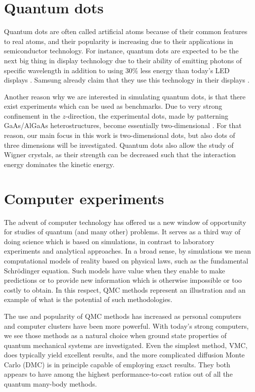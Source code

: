\section{Quantum dots}
Quantum dots are often called artificial atoms because of their common features to real atoms, and their popularity is increasing due to their applications in semiconductor technology. For instance, quantum dots are expected to be the next big thing in display technology due to their ability of emitting photons of specific wavelength in addition to using 30\% less energy than today's LED displays \cite{manders_8.3:_2015}. Samsung already claim that they use this technology in their displays \cite{noauthor_2019_nodate}.

Another reason why we are interested in simulating quantum dots, is that there exist experiments which can be used as benchmarks. Due to very strong confinement in the $z$-direction, the experimental dots, made by patterning GaAs/AlGaAs heterostructures, become essentially two-dimensional \cite{marzin_photoluminescence_1994,brunner_sharp-line_1994}. For that reason, our main focus in this work is two-dimensional dots, but also dots of three dimensions will be investigated. Quantum dots also allow the study of Wigner crystals, as their strength can be decreased such that the interaction energy dominates the kinetic energy. 

\section{Computer experiments}
The advent of computer technology has offered us a new window of opportunity for studies of quantum (and many other) problems. It serves as a third way of doing science which is based on simulations, in contrast to laboratory experiments and analytical approaches. In a broad sense, by simulations we mean computational models of reality based on physical laws, such as the fundamental Schrödinger equation. Such models have value when they enable to make predictions or to provide new information which is otherwise impossible or too costly to obtain. In this respect, QMC methods represent an illustration and an example of what is the potential of such methodologies.

The use and popularity of QMC methods has increased as personal computers and computer clusters have been more powerful. With today's strong computers, we see those methods as a natural choice when ground state properties of quantum mechanical systems are investigated. Even the simplest method, VMC, does typically yield excellent results, and the more complicated diffusion Monte Carlo (DMC) is in principle capable of employing exact results. They both appears to have among the highest performance-to-cost ratios out of all the quantum many-body methods. 

